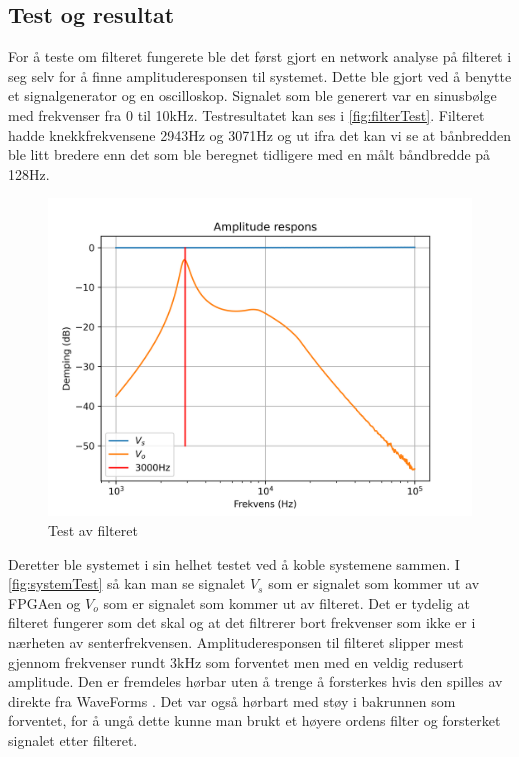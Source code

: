 \subsection{Test og resultat}
\label{test}
For å teste om filteret fungerete ble det først gjort en network analyse på filteret i seg selv for å finne amplituderesponsen til systemet. Dette ble gjort ved å benytte et signalgenerator og en oscilloskop. Signalet som ble generert var en sinusbølge med frekvenser fra 0 til 10kHz. Testresultatet kan ses i \autoref{fig:filterTest}. Filteret hadde knekkfrekvensene 2943Hz og 3071Hz og ut ifra det kan vi se at bånbredden ble litt bredere enn det som ble beregnet tidligere med en målt båndbredde på 128Hz.

\begin{figure} [h]
\centering
\includegraphics[width=0.8\linewidth]{Bilder/Network2.png}
\caption{Test av filteret}
\label{fig:filterTest}
\end{figure}

Deretter ble systemet i sin helhet testet ved å koble systemene sammen. I \autoref{fig:systemTest} så kan man se signalet $V_s$ som er signalet som kommer ut av FPGAen og $V_{o}$ som er signalet som kommer ut av filteret. Det er tydelig at filteret fungerer som det skal og at det filtrerer bort frekvenser som ikke er i nærheten av senterfrekvensen. Amplituderesponsen til filteret slipper mest gjennom frekvenser rundt 3kHz som forventet men med en veldig redusert amplitude. Den er fremdeles hørbar uten å trenge å forsterkes hvis den spilles av direkte fra WaveForms \cite[Digilent Inc.]{Ocili}. Det var også hørbart med støy i bakrunnen som forventet, for å ungå dette kunne man brukt et høyere ordens filter og forsterket signalet etter filteret.



